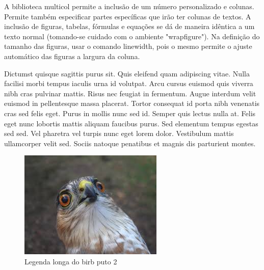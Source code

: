 \documentclass[12pt]{article}
\begin{document}
	\begin{multicols}{3} %
		A biblioteca multicol permite a inclusão de um número personalizado e colunas. Permite também especificar partes específicas que irão ter colunas de textos. A inclusão de figuras, tabelas, fórmulas e equações se dá de maneira idêntica a um texto normal (tomando-se cuidado com o ambiente "wrapfigure"). Na definição do tamanho das figuras, usar o comando linewidth, pois o mesmo permite o ajuste automático das figuras a largura da coluna.
		
		Dictumst quisque sagittis purus sit. Quis eleifend quam adipiscing vitae. Nulla facilisi morbi tempus iaculis urna id volutpat. Arcu cursus euismod quis viverra nibh cras pulvinar mattis. Risus nec feugiat in fermentum. Augue interdum velit euismod in pellentesque massa placerat. Tortor consequat id porta nibh venenatis cras sed felis eget. Purus in mollis nunc sed id. Semper quis lectus nulla at. Felis eget nunc lobortis mattis aliquam faucibus purus. Sed elementum tempus egestas sed sed. Vel pharetra vel turpis nunc eget lorem dolor. Vestibulum mattis ullamcorper velit sed. Sociis natoque penatibus et magnis dis parturient montes.
		
		\begin{figure}[H]	
			\includegraphics[width=1\linewidth]{figuras/birb_03}
			\vspace{-20pt} %
			\caption[Legenda curta do birb puto 2]{Legenda longa do birb puto 2}
			\vspace{-10pt} %
			\label{fig:birb05}
			\vspace{-20pt} %
		\end{figure}
	

\end{multicols}
\end{document}
